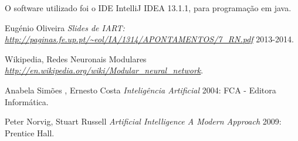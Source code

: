 \documentclass[10pt,a4paper]{article}
\begin{document}
O software utilizado foi o IDE IntelliJ IDEA 13.1.1, para programação em java.


 \begin{thebibliography}{1}

   Eugénio Oliveira {\em Slides de IART: {\url{http://paginas.fe.up.pt/~eol/IA/1314/APONTAMENTOS/7_RN.pdf}}}  2013-2014.
  
   Wikipedia, Redes Neuronais Modulares {\em\url{http://en.wikipedia.org/wiki/Modular_neural_network}}.

   Anabela Simões , Ernesto Costa {\em Inteligência Artificial} 2004: FCA - Editora Informática.
  
   Peter Norvig, Stuart Russell {\em Artificial Intelligence A Modern Approach } 2009: Prentice Hall.
  \end{thebibliography}
  \printindex
\end{document}
